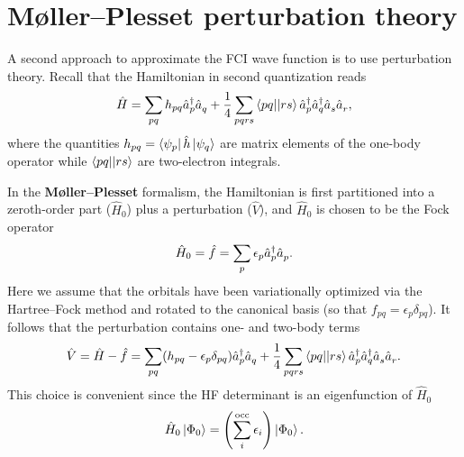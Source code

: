 \documentclass[../Main/chem532-notes.tex]{subfiles}
\begin{document}
\section{M{\o}ller--Plesset perturbation theory}
A second approach to approximate the FCI wave function is to use perturbation theory. Recall that the Hamiltonian in second quantization reads
\begin{equation}
\hat{H} = \sum_{pq} h_{pq} \hat{a}_{p}^{\dagger} \hat{a}_{q}^{\,}
+ \frac{1}{4} \sum_{pqrs} \bra{pq}\!\ket{rs} \hat{a}_{p}^{\dagger}\hat{a}_{q}^{\dagger}\hat{a}_{s}^{\,}\hat{a}_{r}^{\,},
\end{equation}
where the quantities $h_{pq} = \bra{\psi_p} \hat{h} \ket{\psi_q}$ are matrix elements of the one-body operator while $\bra{pq}\!\ket{rs}$ are two-electron integrals.

In the \textbf{M{\o}ller--Plesset} formalism, the Hamiltonian is first partitioned into a zeroth-order part ($\hat{H}_0$) plus a perturbation ($\hat{V}$), and  $\hat{H}_0$ is chosen to be the Fock operator
\begin{equation}
\hat{H}_0   = \hat{f} = \sum_p \epsilon_p \hat{a}_{p}^{\dagger} \hat{a}_{p}^{\,}.
\end{equation}
Here we assume that the orbitals have been variationally optimized via the Hartree--Fock method and rotated to the canonical basis (so that $f_{pq} = \epsilon_p  \delta_{pq}$).
It follows that the perturbation contains one- and two-body terms
\begin{equation}
\hat{V}  = \hat{H} - \hat{f} = \sum_{pq} ( h_{pq}  - \epsilon_p \delta_{pq}) \hat{a}_{p}^{\dagger} \hat{a}_{q}^{\,}
+ \frac{1}{4} \sum_{pqrs} \bra{pq}\!\ket{rs} \hat{a}_{p}^{\dagger}\hat{a}_{q}^{\dagger}\hat{a}_{s}^{\,}\hat{a}_{r}^{\,} .
\end{equation}
This choice is convenient since the HF determinant is an eigenfunction of $\hat{H}_0$
\begin{equation}
\hat{H}_0\ket{\Phi_0} = \left(\sum_i^{\mathrm{occ}} \epsilon_i\right) \ket{\Phi_0}.
\end{equation}
\end{document}
